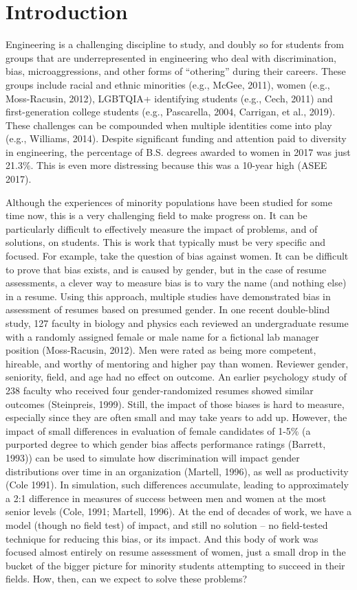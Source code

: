 \section{Introduction}
\label{sec:intro}

 
Engineering is a challenging discipline to study, and doubly so for students from groups that are underrepresented in engineering who deal with discrimination, bias, microaggressions, and other forms of “othering” during their careers. These groups include racial and ethnic minorities (e.g., McGee, 2011), women (e.g., Moss-Racusin, 2012), LGBTQIA+ identifying students (e.g., Cech, 2011) and first-generation college students (e.g., Pascarella, 2004, Carrigan, et al., 2019). These challenges can be compounded when multiple identities come into play (e.g., Williams, 2014). Despite significant funding and attention paid to diversity in engineering, the percentage of B.S. degrees awarded to women in 2017 was just 21.3\%.  This is even more distressing because this was a 10-year high (ASEE 2017). 

 
Although the experiences of minority populations have been studied for some time now, this is a very challenging field to make progress on. It can be particularly difficult to effectively measure the impact of problems, and of solutions, on students. This is work that typically must be very specific and focused. For example, take the question of bias against women. It can be difficult to prove that bias exists, and is caused by gender, but in the case of resume assessments, a clever way to measure bias is to vary the name (and nothing else) in a resume. Using this approach, multiple studies have demonstrated bias in assessment of resumes based on presumed gender. In one recent double-blind study, 127 faculty in biology and physics each reviewed an undergraduate resume with a randomly assigned female or male name for a fictional lab manager position (Moss-Racusin, 2012). Men were rated as being more competent, hireable, and worthy of mentoring and higher pay than women. Reviewer gender, seniority, field, and age had no effect on outcome. An earlier psychology study of 238 faculty who received four gender-randomized resumes showed similar outcomes (Steinpreis, 1999). Still, the impact of those biases is hard to measure, especially since they are often small and may take years to add up. However, the impact of small differences in evaluation of female candidates of 1-5\% (a purported degree to which gender bias affects performance ratings (Barrett, 1993)) can be used to simulate how discrimination will impact gender distributions over time in an organization (Martell, 1996), as well as productivity (Cole 1991). In simulation, such differences accumulate, leading to approximately a 2:1 difference in measures of success between men and women at the most senior levels (Cole, 1991; Martell, 1996). At the end of decades of work, we have a model (though no field test) of impact, and still no solution -- no field-tested technique for reducing this bias, or its impact. And this body of work was focused almost entirely on resume assessment of women, just a small drop in the bucket of the bigger picture for minority students attempting to succeed in their fields. How, then, can we expect to solve these problems? 
 
